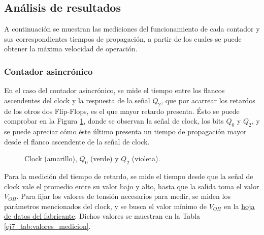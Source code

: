 \subsection{An\'alisis de resultados}
\noindent
A continuaci\'on se muestran las mediciones del funcionamiento de cada contador y sus correspondientes tiempos de propagaci\'on, a partir de los cuales se puede obtener la m\'axima velocidad de operaci\'on.
%
\subsubsection{Contador asincr\'onico}
\label{ej7_sec:meas_cont_asinc}
\noindent
En el caso del contador asincr\'onico, se mide el tiempo entre los flancos ascendentes del clock y la respuesta de la señal $Q_2$, que por acarrear los retardos de los otros dos Flip-Flops, es el que mayor retardo presenta. \'Esto se puede comprobar en la Figura \ref{ej7_fig:asinc_0vs2}, donde se observan la señal de clock, los bits $Q_0$ y $Q_2$, y se puede apreciar c\'omo \'este \'ultimo presenta un tiempo de propagaci\'on mayor desde el flanco ascendente de la señal de clock.
%
\begin{figure}[H]
	\centering
	\caption{Clock (amarillo), $Q_0$ (verde) y $Q_2$ (violeta).}
	\label{ej7_fig:asinc_0vs2}
\end{figure}
%
\noindent
Para la medici\'on del tiempo de retardo, se mide el tiempo desde que la señal de clock vale el promedio entre su valor bajo y alto, hasta que la salida toma el valor $V_{OH}$. Para fijar los valores de tensi\'on necesarios para medir, se miden los par\'ametros mencionados del clock, y se busca el valor m\'inimo de $V_{OH}$ en la \href{https://www.ti.com/lit/ds/symlink/sn74s74.pdf}{hoja de datos del fabricante}. Dichos valores se muestran en la Tabla \ref{ej7_tab:valores_medicion}.
